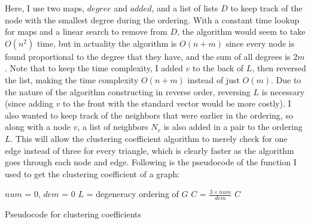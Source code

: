 \documentclass{article}
\begin{document}
    \noindent Here, I use two maps, $degree$ and $added$, and a list of lists
    $D$ to keep track of the node with the smallest degree during the ordering.
    With a constant time lookup for maps and a linear search to remove from 
    $D$, the algorithm would seem to take $O(n^2)$ time, but in actuality the
    algorithm is $O(n + m)$ since every node is found proportional to the degree
    that they have, and the sum of all degrees is $2m$. Note that to keep the
    time complexity, I added $v$ to the back of $L$, then reversed the list,
    making the time complexity $O(n + m)$ instead of just $O(m)$. Due to the
    nature of the algorithm constructing in reverse order, reversing $L$ is
    necessary (since adding $v$ to the front with the standard vector would
    be more costly). 
    \nextblurb
    I also wanted to keep track of the neighbors that were earlier in the 
    ordering, so along with a node $v$, a list of neighbors $N_v$ is also added 
    in a pair to the ordering $L$. This will allow the clustering coefficient 
    algorithm to merely check for one edge instead of three for every triangle,
    which is clearly faster as the algorithm goes through each node and edge.
    Following is the pseudocode of the function I used to get the clustering 
    coefficient of a graph:
    \begin{algorithm}
        \BlankLine
        $num$ = 0, $dem$ = 0\;
        $L$ = degeneracy ordering of $G$\;
        $C$ = $\frac{3 \times num}{dem}$\;
        \Return $C$\;
        \caption{Pseudocode for clustering coefficients}
    \end{algorithm}
\end{document}
